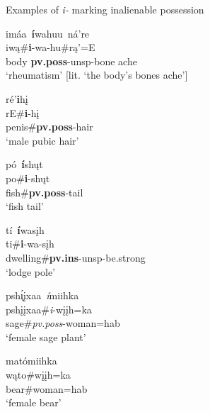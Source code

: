 \begin{exe} 

\item\label{InalienableI} Examples of \textit{i-} marking inalienable possession

    \begin{xlist}
    
    \item\label{InalienableI1} \glll imáa~\textbf{í}wahuu~ná're\\
    iwą\#\textbf{i}-wa-hu\#rą'=E\\
    \textnormal{body} \textbf{pv.poss}-unsp-\textnormal{bone} \textnormal{ache}\\
    \glt `rheumatism' [lit. `the body's bones ache'] \citep[96]{hollow1970}
    
    \item\label{InalienableI2} \glll ré'\textbf{i}hį\\
    rE\#\textbf{i}-hį\\
    \textnormal{penis}\#\textbf{pv.poss}-\textnormal{hair}\\
    \glt `male pubic hair' \citep[175]{hollow1970}
    
    \item\label{InalienableI3} \glll pó~\textbf{í}shųt\\
    po\#\textbf{i}-shųt\\
    \textnormal{fish}\#\textbf{pv.poss}-\textnormal{tail}\\
    \glt `fish tail' \citep[241]{hollow1970}
    
    \item\label{InalienableI4} \glll tí~\textbf{í}wasįh\\
    ti\#\textbf{i}-wa-sįh\\
    \textnormal{dwelling}\#\textbf{pv.ins}-unsp-\textnormal{be.strong}\\
    \glt `lodge pole' \citep[250]{hollow1970}
    
    \item\label{InalienableI5} \glll psh\'{ı̨}įxaa~\textit{í}miihka\\
    pshįįxaa\#\textit{i}-wįįh=ka\\
    \textnormal{sage}\#\textit{pv.poss}-\textnormal{woman}=hab\\
    \glt `female sage plant' \citep[286]{hollow1970}
    
    \item\label{InalienableI6} \glll matómiihka\\
    wąto\#wįįh=ka\\
    \textnormal{bear}\#\textnormal{woman}=hab\\
    \glt `female bear' \citep[286]{hollow1970}
    
    \end{xlist}

\end{exe}

